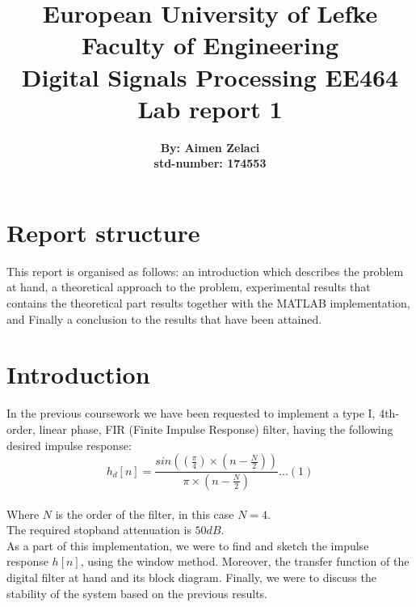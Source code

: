 \documentclass[12pt]{IEEEtran}
\begin{document}
\title{{European University of Lefke} \\ [0.9cm] {Faculty of Engineering} \\ [0.9cm] {Digital Signals Processing EE464} \\ [0.9cm]{Lab report 1}}
\author{\Large \textbf{By: Aimen Zelaci} \\ [0.4cm] \textbf{std-number: 
174553}}
\maketitle

\section{Report structure}
This report is organised as follows: an introduction which describes the problem at hand, a theoretical approach to the problem, experimental results that contains the theoretical part results together with the MATLAB implementation, and Finally a conclusion to the results that have been attained.

\section{Introduction}
In the previous coursework we have been requested to implement a type I, 4th-order, linear phase, FIR (Finite Impulse Response) filter, having the following desired impulse response:\\
\[h_{d}[n] = \frac{sin((\frac{\pi}{4}) \times (n - \frac{N}{2}))} {\pi \times (n - \frac{N}{2})} . . . (1)\] \\
Where $N$ is the order of the filter, in this case $N = 4$.\\
The required stopband attenuation is $50 dB$.\\
As a part of this implementation, we were to find and sketch the impulse response $h[n]$, using the window method. Moreover, the transfer function of the digital filter at hand and its block diagram. Finally, we were to discuss the stability of the system based on the previous results.
\end{document}
